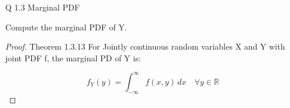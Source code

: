 \documentclass[12pt]{amsart}
\theoremstyle{remark}
\numberwithin{equation}{section} \numberwithin{thm}{section}
\numberwithin{rmk}{section} \numberwithin{figure}{section}
\begin{document}
\title{}



Q 1.3 Marginal PDF

Compute the marginal PDF of Y. 


\begin{proof}

Theorem 1.3.13 For Jointly continuous random variables X and Y with joint PDF f, the marginal PD of Y is:

\[
f_Y(y) = \int_{-\infty}^{\infty} f(x, y)\, dx \quad \forall y \in \mathbb{R}
\]

\end{proof}
\end{document}
